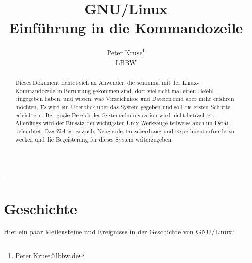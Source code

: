 \documentclass[titlepage,a4paper]{article}
\begin{document}
\hypersetup{pageanchor=false}
\title{GNU/Linux\\Einführung in die Kommandozeile}
\author{Peter Kruse\thanks{Peter.Kruse@lbbw.de}\\LBBW}
\maketitle

\thispagestyle{empty}
\vspace*{\fill}
\emph{-}

\rightline{---}
\vspace*{\fill}

\begin{abstract}
Dieses Dokument richtet sich an
Anwender, die schonmal mit der Linux-Kom\-man\-do\-zei\-le in Be\-rüh\-rung gekommen sind,
dort vielleicht mal einen Befehl eingegeben haben, und wissen,
was Verzeichnisse und Dateien sind aber mehr erfahren möchten.
Es wird ein Überblick über das System gegeben und soll die
ersten Schritte erleichtern.  Der große Bereich der Systemadministration wird
nicht betrachtet.  Allerdings wird der Einsatz der wichtigsten Unix Werkzeuge
teilweise auch im Detail beleuchtet.  Das Ziel ist es auch, Neugierde,
Forscherdrang und Experimentierfreude zu wecken und die Begeisterung für
dieses System weiterzugeben. 
\end{abstract}

\hypersetup{pageanchor=true}
\tableofcontents
\newpage

\pagestyle{fancy}
\section{Geschichte}

Hier ein paar Meilensteine und Ereignisse in der Geschichte von GNU/Linux:
\end{document}
